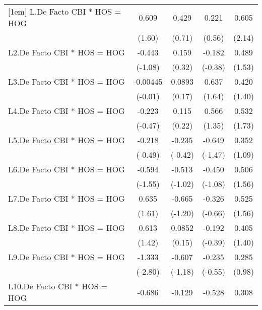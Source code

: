 {\begin{longtable}{l*{4}{c}}
[1em]
L.De Facto CBI * HOS = HOG&    0.609         &    0.429         &    0.221         &    0.605\sym{*}  \\
                &   (1.60)         &   (0.71)         &   (0.56)         &   (2.14)         \\
[1em]
L2.De Facto CBI * HOS = HOG&   -0.443         &    0.159         &   -0.182         &    0.489         \\
                &  (-1.08)         &   (0.32)         &  (-0.38)         &   (1.53)         \\
[1em]
L3.De Facto CBI * HOS = HOG& -0.00445         &   0.0893         &    0.637         &    0.420         \\
                &  (-0.01)         &   (0.17)         &   (1.64)         &   (1.40)         \\
[1em]
L4.De Facto CBI * HOS = HOG&   -0.223         &    0.115         &    0.566         &    0.532         \\
                &  (-0.47)         &   (0.22)         &   (1.35)         &   (1.73)         \\
[1em]
L5.De Facto CBI * HOS = HOG&   -0.218         &   -0.235         &   -0.649         &    0.352         \\
                &  (-0.49)         &  (-0.42)         &  (-1.47)         &   (1.09)         \\
[1em]
L6.De Facto CBI * HOS = HOG&   -0.594         &   -0.513         &   -0.450         &    0.506         \\
                &  (-1.55)         &  (-1.02)         &  (-1.08)         &   (1.56)         \\
[1em]
L7.De Facto CBI * HOS = HOG&    0.635         &   -0.665         &   -0.326         &    0.525         \\
                &   (1.61)         &  (-1.20)         &  (-0.66)         &   (1.56)         \\
[1em]
L8.De Facto CBI * HOS = HOG&    0.613         &   0.0852         &   -0.192         &    0.405         \\
                &   (1.42)         &   (0.15)         &  (-0.39)         &   (1.40)         \\
[1em]
L9.De Facto CBI * HOS = HOG&   -1.333\sym{**} &   -0.607         &   -0.235         &    0.285         \\
                &  (-2.80)         &  (-1.18)         &  (-0.55)         &   (0.98)         \\
[1em]
L10.De Facto CBI * HOS = HOG&   -0.686         &   -0.129         &   -0.528         &    0.308         \\

\end{longtable}}
